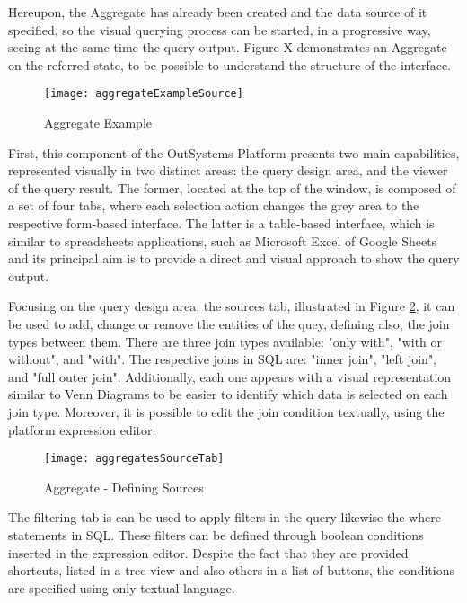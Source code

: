 Hereupon, the Aggregate has already been created and the data source of it specified, so the visual querying process can be started, in a progressive way, seeing at the same time the query output. Figure X demonstrates an Aggregate on the referred state, to be possible to understand the structure of the interface.

\begin{figure}[htbp]
	\centering
	\texttt{[image: aggregateExampleSource]}
	\caption{Aggregate Example}
	\label{fig:aggregate_created}
\end{figure}

First, this component of the OutSystems Platform presents two main capabilities, represented visually in two distinct areas: the query design area, and the viewer of the query result. The former, located at the top of the window, is composed of a set of four tabs, where each selection action changes the grey area to the respective form-based interface. The latter is a table-based interface, which is similar to spreadsheets applications, such as Microsoft Excel \cite{microsoftExcel} of Google Sheets \cite{googleSheets} and its principal aim is to provide a direct and visual approach to show the query output.

Focusing on the query design area, the sources tab, illustrated in Figure \ref{fig:aggregates_source_tab}, it can be used to add, change or remove the entities of the quey, defining also, the join types between them. There are three join types available: "only with", "with or without", and "with". The respective joins in SQL are: "inner join", "left join", and "full outer join". Additionally, each one appears with a visual representation similar to Venn Diagrams \cite{venn1880diagrams} to be easier to identify which data is selected on each join type. Moreover, it is possible to edit the join condition textually, using the platform expression editor.

\begin{figure}[htbp]
	\centering
	\texttt{[image: aggregatesSourceTab]}
	\caption{Aggregate - Defining Sources}
	\label{fig:aggregates_source_tab}
\end{figure}

The filtering tab is can be used to apply filters in the query likewise the where statements in SQL. These filters can be defined through boolean conditions inserted in the expression editor. Despite the fact that they are provided shortcuts, listed in a tree view and also others in a list of buttons, the conditions are specified using only textual language. 

